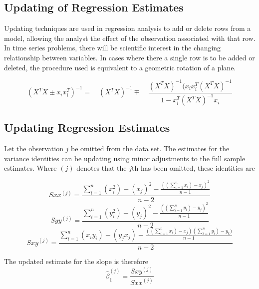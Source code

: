 \documentclass[]{report}
\begin{document}
\subsection{Updating of Regression Estimates}
Updating techniques are used in regression analysis to add or
delete rows from a model, allowing the analyst the effect of the
observation associated with that row. In time series problems,
there will be scientific interest in the changing relationship
between variables. In cases where there a single row is to be
added or deleted, the procedure used is equivalent to a geometric
rotation of a plane.

%
%

\begin{equation}
(X^{T}X \pm x_{i}x_{i}^{T})^{-1} = \quad(X^{T}X )^{-1} \mp \quad
\frac{(X^{T}X)^{-1}(x_{i}x_{i}^{T}(X^{T}X)^{-1}}{1-x_{i}^{T}(X^{T}X)^{-1}x_{i}}
\end{equation}


\subsection{Updating Regression Estimates}
Let the observation $j$ be omitted from the data set. The estimates for the variance identities can be updating using minor adjustments to the full sample estimates. Where $(j)$ denotes that the $j$th has been omitted, these identities are


\begin{equation}
Sxx^{(j)}=\frac{\sum_{i=1}^{n}(x_{i}^{2})-(x_{j})^{2}-\frac{((\sum_{i=1}^{n}x_{i})-x_{j})^{2}}{n-1}}{n-2}
\end{equation}
\begin{equation}
Syy^{(j)}=\frac{\sum_{i=1}^{n}(y_{i}^{2})-(y_{j})^{2}-\frac{((\sum_{i=1}^{n}y_{i})-y_{j})^{2}}{n-1}}{n-2}
\end{equation}
\begin{equation}
Sxy^{(j)}=\frac{\sum_{i=1}^{n}(x_{i}y_{i})-(y_{j}x_{j})-\frac{((\sum_{i=1}^{n}x_{i})-x_{j})(\sum_{i=1}^{n}y_{i})-y_{k})}{n-1}}{n-2}
\end{equation}


The updated estimate for the slope is therefore
\begin{equation}
\hat{\beta}_{1}^{(j)}=\frac{Sxy^{(j)}}{Sxx^{(j)}}
\end{equation}
\end{document}
